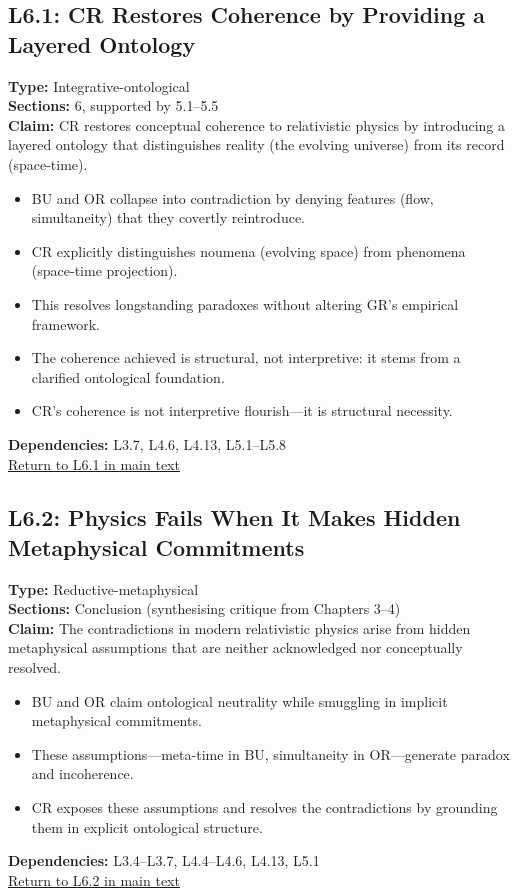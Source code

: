 \documentclass[12pt]{book}
\newcommand{\returnlink}[1]{\hyperref[logic:#1]{Return to #1 in main text}\xspace}
\begin{document}
\subsection*{L6.1: CR Restores Coherence by Providing a Layered Ontology}
\label{appendix:L6.1}
\textbf{Type:} Integrative-ontological \\
\textbf{Sections:} 6, supported by 5.1–5.5 \\
\textbf{Claim:} CR restores conceptual coherence to relativistic physics by introducing a layered ontology that distinguishes reality (the evolving universe) from its record (space-time).
\begin{itemize}
  \item BU and OR collapse into contradiction by denying features (flow, simultaneity) that they covertly reintroduce.
  \item CR explicitly distinguishes noumena (evolving space) from phenomena (space-time projection).
  \item This resolves longstanding paradoxes without altering GR's empirical framework.
  \item The coherence achieved is structural, not interpretive: it stems from a clarified ontological foundation.
  \item CR's coherence is not interpretive flourish---it is structural necessity.
\end{itemize}
\textbf{Dependencies:} L3.7, L4.6, L4.13, L5.1–L5.8 \\
\returnlink{L6.1}

\subsection*{L6.2: Physics Fails When It Makes Hidden Metaphysical Commitments}
\label{appendix:L6.2}
\textbf{Type:} Reductive-metaphysical \\
\textbf{Sections:} Conclusion (synthesising critique from Chapters 3–4) \\
\textbf{Claim:} The contradictions in modern relativistic physics arise from hidden metaphysical assumptions that are neither acknowledged nor conceptually resolved.
\begin{itemize}
  \item BU and OR claim ontological neutrality while smuggling in implicit metaphysical commitments.
  \item These assumptions---meta-time in BU, simultaneity in OR---generate paradox and incoherence.
  \item CR exposes these assumptions and resolves the contradictions by grounding them in explicit ontological structure.
\end{itemize}
\textbf{Dependencies:} L3.4–L3.7, L4.4–L4.6, L4.13, L5.1 \\
\returnlink{L6.2}
\end{document}
